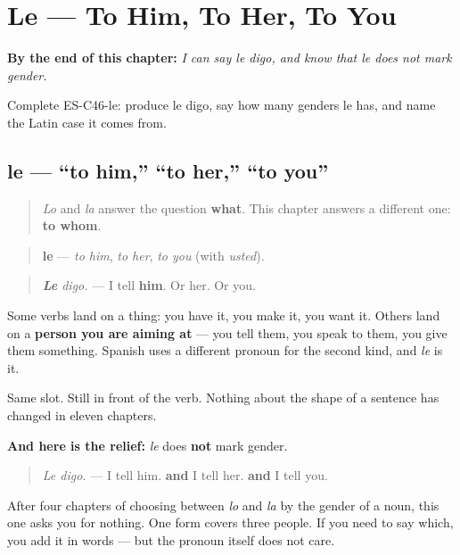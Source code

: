 
\chapter{Le --- To Him, To Her, To You}
\label{ch:pronoun-le}

\begin{chapteropening}
\textbf{By the end of this chapter:} \emph{I can say le digo, and know that le does not mark gender.}

Complete ES-C46-le: produce le digo, say how many genders le has, and name the Latin case it comes from.
\end{chapteropening}

\section[le]{le — \textquotedblleft{}to him,\textquotedblright{} \textquotedblleft{}to her,\textquotedblright{} \textquotedblleft{}to you\textquotedblright{}}

\label{lesson:ES-C46-le}



\begin{quote}
\emph{Lo} and \emph{la} answer the question \textbf{what}. This chapter answers a different one: \textbf{to whom}.
\end{quote}

\begin{grammarlens}[title={Grammar Lens: the other question}]
\begin{quote}
\textbf{le} — \emph{to him}, \emph{to her}, \emph{to you} (with \emph{usted}).
\end{quote}

\begin{quote}
\emph{\textbf{Le} digo.} — I tell \textbf{him}. Or her. Or you.
\end{quote}

Some verbs land on a thing: you have it, you make it, you want it. Others land on a \textbf{person you are aiming at} — you tell them, you speak to them, you give them something. Spanish uses a different pronoun for the second kind, and \emph{le} is it.

Same slot. Still in front of the verb. Nothing about the shape of a sentence has changed in eleven chapters.

\textbf{And here is the relief:} \emph{le} does \textbf{not} mark gender.

\begin{quote}
\emph{Le digo.} — I tell him. \textbf{and} I tell her. \textbf{and} I tell you.
\end{quote}

After four chapters of choosing between \emph{lo} and \emph{la} by the gender of a noun, this one asks you for nothing. One form covers three people. If you need to say which, you add it in words — but the pronoun itself does not care.
\end{grammarlens}

